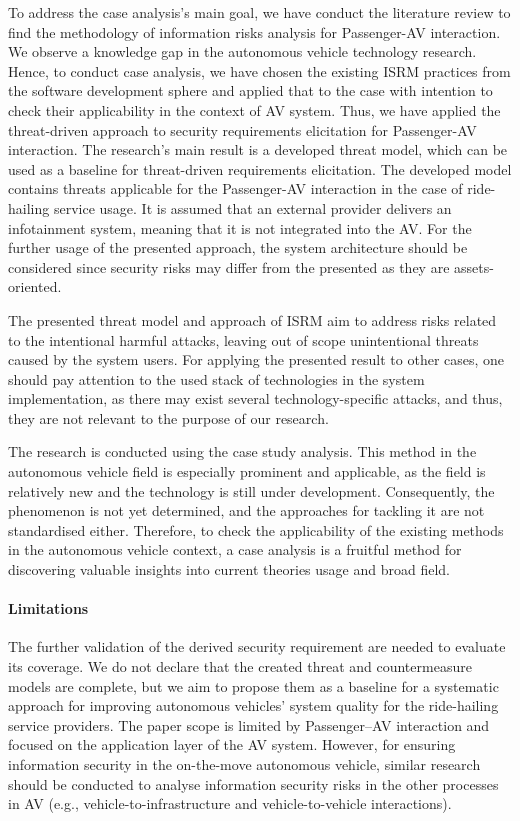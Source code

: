 \documentclass[manuscript]{acmart}
\begin{document}
To address the case analysis's main goal, we have conduct the literature review to find the methodology of information risks analysis for Passenger-AV interaction. 
We observe a knowledge gap in the autonomous vehicle technology research. Hence, to conduct case analysis, we have chosen the existing ISRM practices from the software development sphere and applied that to the case with intention to check their applicability in the context of AV system. 
Thus, we have applied the threat-driven approach to security requirements elicitation for Passenger-AV interaction. The research's main result is a developed threat model, which can be used as a baseline for threat-driven requirements elicitation. The developed model contains threats applicable for the Passenger-AV interaction in the case of ride-hailing service usage. It is assumed that an external provider delivers an infotainment system, meaning that it is not integrated into the AV. For the further usage of the presented approach, the system architecture should be considered since security risks may differ from the presented as they are assets-oriented.

The presented threat model and approach of ISRM aim to address risks related to the intentional harmful attacks, leaving out of scope unintentional threats caused by the system users. For applying the presented result to other cases, one should pay attention to the used stack of technologies in the system implementation, as there may exist several technology-specific attacks, and thus, they are not relevant to the purpose of our research.

The research is conducted using the case study analysis. This method in the autonomous vehicle field is especially prominent and applicable, as the field is relatively new and the technology is still under development. Consequently, the phenomenon is not yet determined, and the approaches for tackling it are not standardised either. Therefore, to check the applicability of the existing methods in the autonomous vehicle context, a case analysis is a fruitful method for discovering valuable insights into current theories usage and broad field. 

\paragraph{Limitations}
The further validation of the derived security requirement are needed to evaluate its coverage. We do not declare that the created threat and countermeasure models are complete, but we aim to propose them as a baseline for a systematic approach for improving autonomous vehicles' system quality for the ride-hailing service providers. The paper scope is limited by Passenger--AV interaction and focused on the application layer of the AV system. However, for ensuring information security in the on-the-move autonomous vehicle, similar research should be conducted to analyse information security risks in the other processes in AV (e.g., vehicle-to-infrastructure and vehicle-to-vehicle interactions).
\end{document}
